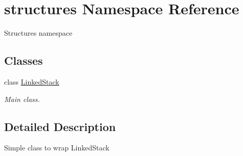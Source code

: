 \hypertarget{namespacestructures}{}\section{structures Namespace Reference}
\label{namespacestructures}


Structures namespace 


\subsection*{Classes}
\begin{DoxyCompactItemize}
\item 
class \mbox{\hyperlink{classstructures_1_1_linked_stack}{Linked\+Stack}}
\begin{DoxyCompactList}\small\item\em Main class. \end{DoxyCompactList}\end{DoxyCompactItemize}


\subsection{Detailed Description}
Simple class to wrap LinkedStack